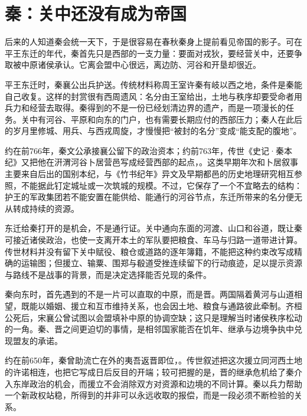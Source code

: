 \section{秦：关中还没有成为帝国}

后来的人知道秦会统一天下，于是很容易在春秋秦身上提前看见帝国的影子。可在平王东迁的年代，秦首先只是西部的一支力量：要面对戎狄，要经营关中，还要争取被中原诸侯承认。它离会盟中心很远，离边防、河谷和开垦却很近。


平王东迁时，秦襄公出兵护送。传统材料称周王室许秦有岐以西之地，条件是秦能自己收复。这样的封赏很有西周遗风：名分由王室给出，土地与秩序却要受命者用兵力和经营去取得。秦得到的不是一份已经划清边界的遗产，而是一项漫长的任务。关中有河谷、平原和向东的门户，也有需要长期应付的西部压力；秦人在此后的岁月里修城、用兵、与西戎周旋，才慢慢把“被封的名分”变成“能支配的腹地”。

约在前766年，秦文公承接襄公留下的政治资本；约前763年，传世《史记·秦本纪》又把他在汧渭河谷卜居营邑写成经营西部的起点，。这类早期年次和卜居叙事主要来自后出的国别本纪，与《竹书纪年》异文及早期都邑的历史地理研究相互参照，不能据此钉定城址或一次筑城的规模。不过，它保存了一个不宜略去的结构：护王的军政集团若不能安置在能供给、能通行的河谷节点，东迁所带来的名分便无从转成持续的资源。



东迁给秦打开的是机会，不是通行证。关中通向东面的河渡、山口和谷道，既让秦可接近诸侯政治，也使一支离开本土的军队要把粮食、车马与归路一道带进计算。传世材料并没有留下关中赋役、粮仓或道路的逐年簿籍，不能把这种约束改写成精确的运输图；但援立、输粟、围郑与殽道受挫连续留下的行动痕迹，足以提示资源与路线不是战事的背景，而是决定选择能否兑现的条件。

秦向东时，首先遇到的不是一片可以直取的中原，而是晋。两国隔着黄河与山道相望，既能以婚姻、援立和互市维持关系，也会因土地、粮食与通路彼此牵制。齐桓公死后，宋襄公曾试图以会盟填补中原的协调空缺；这只是理解当时诸侯秩序松动的一角。秦、晋之间更迫切的事情，是相邻国家能否在饥年、继承与边境争执中兑现盟友的承诺。

约在前650年，秦曾助流亡在外的夷吾返晋即位，。传世叙述把这次援立同河西土地的许诺相连，也把它写成日后反目的开端；较可把握的是，晋的继承危机给了秦介入东岸政治的机会，而援立不会消除双方对资源和边境的不同计算。秦以兵力帮助一个新政权站稳，所得到的并非可以永远收取的报偿，而是一段必须不断检验的关系。

